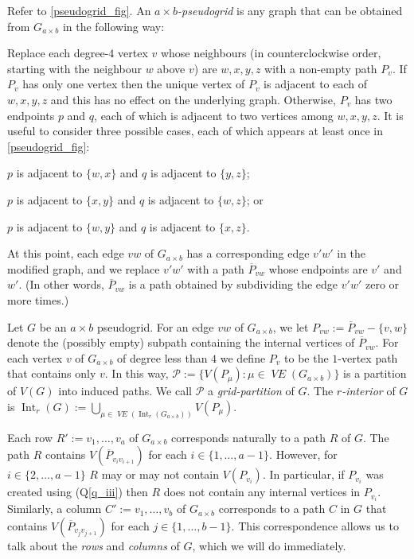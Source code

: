 \documentclass{patmorin}
\DeclareMathOperator{\interior}{Int}
\newcommand{\defin}[1]{\emph{\color{brightmaroon}#1}}
\DeclareMathOperator{\VE}{\mathit{VE}}
\begin{document}
Refer to \cref{pseudogrid_fig}.  An \defin{$a\times b$-pseudogrid} is any graph that can be obtained from $G_{a\times b}$ in the following way:
\begin{compactitem}
  \item Replace each degree-$4$ vertex $v$ whose neighbours (in counterclockwise order, starting with the neighbour $w$ above $v$) are $w,x,y,z$ with a non-empty path $P_v$. If $P_v$ has only one vertex then the unique vertex of $P_v$ is adjacent to each of $w,x,y,z$ and this has no effect on the underlying graph.  Otherwise, $P_v$ has two endpoints $p$ and $q$, each of which is adjacent to two vertices among $w,x,y,z$.  It is useful to consider three possible cases, each of which appears at least once in \cref{pseudogrid_fig}:
  \begin{compactenum}[(Q1)]
    \item \label{q_i} $p$ is adjacent to $\{w,x\}$ and $q$ is adjacent to $\{y,z\}$;
    \item \label{q_ii} $p$ is adjacent to $\{x,y\}$ and $q$ is adjacent to $\{w,z\}$; or
    \item \label{q_iii} $p$ is adjacent to $\{w,y\}$ and $q$ is adjacent to $\{x,z\}$.
  \end{compactenum}
  \item At this point, each edge $vw$ of $G_{a\times b}$ has a corresponding edge $v'w'$ in the modified graph, and we replace $v'w'$ with a path $\overline{P}_{vw}$ whose endpoints are $v'$ and $w'$.  (In other words, $\overline{P}_{vw}$ is a path obtained by subdividing the edge $v'w'$ zero or more times.)
\end{compactitem}

Let $G$ be an $a\times b$ pseudogrid.  For an edge $vw$ of $G_{a\times b}$, we let $P_{vw}:=\overline{P}_{vw}-\{v,w\}$ denote the (possibly empty) subpath containing the internal vertices of $\overline{P}_{vw}$.  For each vertex $v$ of $G_{a\times b}$ of degree less than $4$ we define $P_{v}$ to be the $1$-vertex path that contains only $v$.  In this way, $\mathcal{P}:=\{V(P_\mu):\mu\in \VE(G_{a\times b})\}$ is a partition of $V(G)$ into induced paths.  We call $\mathcal{P}$ a \defin{grid-partition} of $G$.
The \defin{$r$-interior} of $G$ is $\interior_r(G):=\bigcup_{\mu\in\VE(\interior_r(G_{a\times b}))} V(P_\mu)$.


Each row $R':=v_1,\ldots,v_a$ of $G_{a\times b}$ corresponds naturally to a path $R$ of $G$. The path $R$ contains $V(\overline{P}_{v_iv_{i+1}})$ for each $i\in\{1,\ldots,a-1\}$.  However, for $i\in\{2,\ldots,a-1\}$ $R$ may or may not contain $V(P_{v_i})$.  In particular, if $P_{v_i}$ was created using (Q\ref{q_iii}) then $R$ does not contain any internal vertices in $P_{v_i}$. Similarly, a column $C':=v_1,\ldots,v_b$ of $G_{a\times b}$ corresponds to a path $C$  in $G$ that contains $V(\overline{P}_{v_jv_{j+1}})$ for each $j\in\{1,\ldots,b-1\}$. This correspondence allows us to talk about the \defin{rows} and \defin{columns} of $G$, which we will do immediately.
\end{document}
